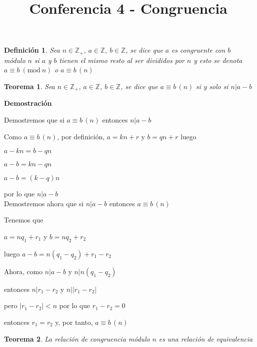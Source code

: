 \documentclass[a4paper,12pt]{report}
\title{Conferencia 4 - Congruencia}
\author{}
\newtheorem*{teo}{Teorema}
\newtheorem*{dfn}{Definición}
\begin{document}
\maketitle


\begin{dfn}
 Sea $n\in \mathbb{Z}_+$, $a\in \mathbb{Z}$, $b\in \mathbb{Z}$, se dice que $a$ es congruente con $b$ módulo $n$ si $a$ y $b$ tienen el mismo resto al ser divididos por $n$ y esto se denota $ a\equiv b \ (\textrm{mod}\ n)$ o $a\equiv b\, (n)$
\end{dfn}

\begin{teo}
 Sea $n\in \mathbb{Z}_+$, $a\in \mathbb{Z}$, $b\in \mathbb{Z}$, se dice que $a \equiv b \, (n)$ si y solo si $n|a-b$
\end{teo}

\textbf{Demostración}

Demostremos que si $a\equiv b\, (n)$ entonces $n|a-b$

Como $a\equiv b\, (n)$, por definición, $a=kn+r$ y $b=qn+r$  luego 

$a-kn=b-qn$ 

$a-b=kn-qn$

$a-b=(k-q)n$

por lo que $n|a-b$
\\

Demostremos ahora que si $n|a-b$ entonces $a\equiv b\, (n)$

Tenemos que 

$a=nq_1+r_1$ y $b=nq_2+r_2$

luego $a-b=n(q_1-q_2) + r_1 - r_2$

Ahora, como $n|a-b$ y $n|n(q_1-q_2)$

entonces $n|r_1-r_2$ y $n||r_1-r_2|$

pero $|r_1-r_2|<n$ por lo que $r_1-r_2=0$

entonces $r_1=r_2$ y, por tanto, $a\equiv b\, (n)$

\begin{teo}
 La relación de congruencia módulo $n$ es una relación de equivalencia
\end{teo}
\end{document}
